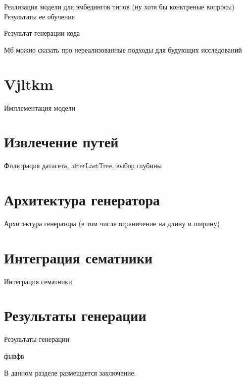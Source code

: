 \documentclass[times,specification,annotation]{itmo-student-thesis}
\begin{document}
Реализация модели для эмбедингов типов (ну хотя бы конктреные вопросы)
Результаты ее обучения

Результат генерации кода

Мб можно сказать про нереализованные подходы для будующих исследований

\section{Vjltkm}\label{sec:impl}
Имплементация модели

\section{Извлечение путей}\label{sec:extract}
Фильтрация датасета, afterLastTree, выбор глубины

\section{Архитектура генератора}\label{sec:generator}
Архитектура генератора (в том числе ограничение на длину и ширину)

\section{Интеграция сематники}\label{sec:semanticIntegration}
Интеграция сематники

\section{Результаты генерации}\label{sec:generationResult}
Результаты генерации

\chapterconclusion
фывфв


\startconclusionpage

В данном разделе размещается заключение.

\printmainbibliography
\end{document}
